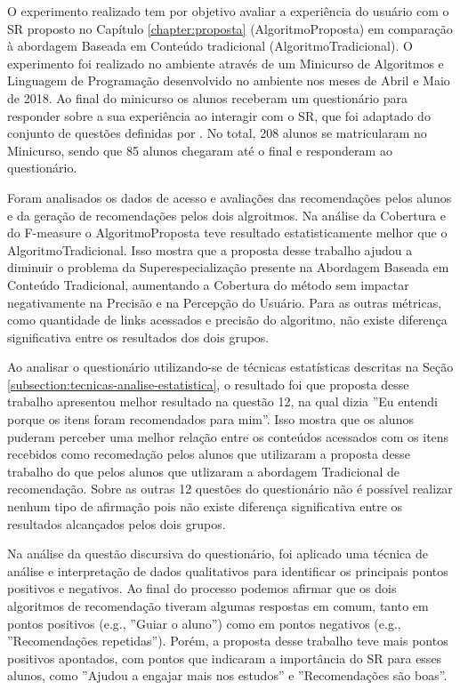O experimento realizado tem por objetivo avaliar a experiência do usuário com o SR proposto no Capítulo \ref{chapter:proposta}
(AlgoritmoProposta) em comparação à abordagem Baseada em Conteúdo tradicional (AlgoritmoTradicional). O experimento foi
realizado no ambiente \adaptwebspace através de um Minicurso de Algoritmos e Linguagem de Programação desenvolvido no
ambiente nos meses de Abril e Maio de 2018. Ao final do minicurso os alunos receberam um questionário para responder
sobre a sua experiência ao interagir com o SR, que foi adaptado do conjunto de questões definidas por
. No total, 208 alunos se matricularam no Minicurso, sendo que 85 alunos chegaram até o final e
responderam ao questionário.

Foram analisados os dados de acesso e avaliações das recomendações pelos alunos e da geração de recomendações pelos dois
algroitmos. Na análise da Cobertura e do F-measure o AlgoritmoProposta teve resultado estatisticamente melhor que
o AlgoritmoTradicional. Isso mostra que a proposta desse trabalho ajudou a diminuir o problema da Superespecialização
presente na Abordagem Baseada em Conteúdo Tradicional, aumentando a Cobertura do método sem impactar negativamente na
Precisão e na  Percepção do Usuário. Para as outras métricas, como quantidade de links acessados e precisão do
algoritmo, não existe diferença significativa entre os resultados dos dois grupos.

Ao analisar o questionário utilizando-se de técnicas estatísticas descritas na Seção \ref{subsection:tecnicas-analise-estatistica},
o resultado foi que proposta desse trabalho apresentou melhor resultado na questão 12, na qual dizia
''Eu entendi porque os itens foram recomendados para mim''. Isso mostra que os alunos puderam perceber uma melhor relação
entre os conteúdos acessados com os itens recebidos como recomedação pelos alunos que utilizaram a proposta desse trabalho
do que pelos alunos que utlizaram a abordagem Tradicional de recomendação. Sobre as outras 12 questões do questionário
não é possível realizar nenhum tipo de afirmação pois não existe diferença significativa entre os resultados
alcançados pelos dois grupos.

Na análise da questão discursiva do questionário, foi aplicado uma técnica de análise e interpretação de dados qualitativos
para identificar os principais pontos positivos e negativos. Ao final do processo podemos afirmar que os dois algoritmos
de recomendação tiveram algumas respostas em comum, tanto em pontos positivos (e.g., ''Guiar o aluno'') como em pontos
negativos (e.g., ''Recomendações repetidas''). Porém, a proposta desse trabalho teve mais pontos positivos apontados,
com pontos que indicaram a importância do SR para esses alunos, como ''Ajudou a engajar mais nos estudos'' e ''Recomendações são boas''.

